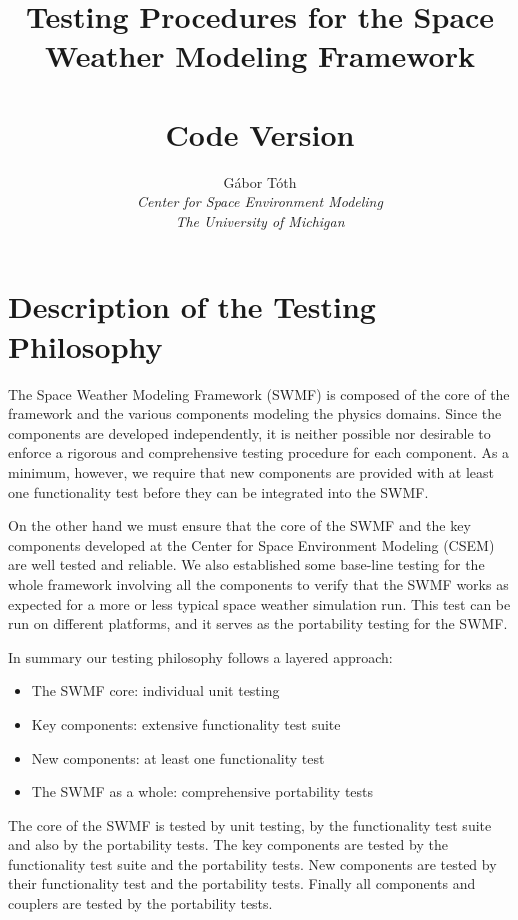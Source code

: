 \documentclass[twoside,10pt]{article}
\title{Testing Procedures for the Space Weather Modeling Framework\\
       \hfill \\
       \large Code Version \SWMFVERSION}
\author{G\'abor T\'oth\\
  {\it Center for Space Environment Modeling}\\
  {\it The University of Michigan}}
\begin{document}
\pagestyle{fancy}
\lhead[\fancyplain{}{\bfseries\thepage}]{\fancyplain{}{\bfseries\rightmark}}
\rhead[\fancyplain{}{\bfseries\leftmark}]{\fancyplain{}{\bfseries\thepage}}
\cfoot{}

\maketitle

\newpage

\tableofcontents

\newpage

\section{Description of the Testing Philosophy}

The Space Weather Modeling Framework (SWMF) is
composed of the core of the framework and the various components
modeling the physics domains. Since the components are developed 
independently, it is neither possible nor desirable to enforce a
rigorous and comprehensive testing procedure for each component.
As a minimum, however, we require that new components are provided
with at least one functionality test before they can be integrated
into the SWMF.

On the other hand we must ensure that the core of the SWMF and
the key components developed at the Center for Space Environment
Modeling (CSEM) are well tested and reliable. 
We also established some base-line testing for the whole
framework involving all the components to verify that the SWMF
works as expected for a more or less typical space weather simulation
run. This test can be run on different platforms, and it serves as
the portability testing for the SWMF.

In summary our testing philosophy follows a layered approach:
\begin{itemize}
\item The SWMF core: individual unit testing
\item Key components: extensive functionality test suite
\item New components: at least one functionality test
\item The SWMF as a whole: comprehensive portability tests
\end{itemize}
The core of the SWMF is tested by unit testing, by the functionality
test suite and also by the portability tests. The key components
are tested by the functionality test suite and the portability tests.
New components are tested by their functionality test and the 
portability tests. Finally all components and couplers are tested
by the portability tests.
\end{document}
